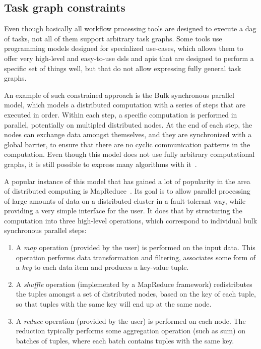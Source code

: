 \subsection*{Task graph constraints}
Even though basically all workflow processing tools are designed to execute a
\gls{dag} of tasks, not all of them support arbitrary task graphs. Some tools use
programming models designed for specialized use-cases, which allows them to offer very high-level
and easy-to-use \glspl{dsl} and \glspl{api} that are designed to perform a
specific set of things well, but that do not allow expressing fully general task graphs.

An example of such constrained approach is the Bulk synchronous parallel~\cite{bulkparallel1}
model, which models a distributed computation with a series of steps that are executed in order.
Within each step, a specific computation is performed in parallel, potentially on multipled
distributed nodes. At the end of each step, the nodes can exchange data amongst themselves, and
they are synchronized with a global barrier, to ensure that there are no cyclic communication
patterns in the computation. Even though this model does not use fully arbitrary computational
graphs, it is still possible to express many algorithms with it~\cite{bulkparallel2}.

A popular instance of this model that has gained a lot of popularity in the area of distributed
computing is MapReduce~\cite{mapreduce}. Its goal is to allow parallel processing of large
amounts of data on a distributed cluster in a fault-tolerant way, while providing a very simple
interface for the user. It does that by structuring the computation into three high-level
operations, which correspond to individual bulk synchronous parallel steps:
\begin{enumerate}
	\item A \emph{map} operation (provided by the user) is performed on the input data. This
	      operation performs data transformation and filtering, associates some form of a
	      \emph{key} to each data item and produces a key-value tuple.
	\item A \emph{shuffle} operation (implemented by a MapReduce framework) redistributes the tuples
	      amongst a set of distributed nodes, based on the key of each tuple, so that tuples with the same
	      key will end up at the same node.
	\item A \emph{reduce} operation (provided by the user) is performed on each node. The reduction
	      typically performs some aggregation operation (such as sum) on batches of tuples, where each batch
	      contains tuples with the same key.
\end{enumerate}

